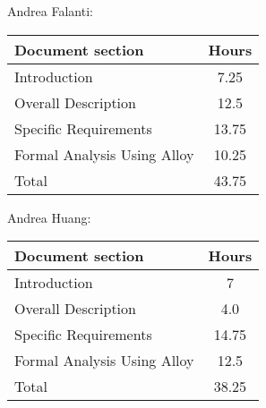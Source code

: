 Andrea Falanti:

\begin{tabular}{|l|c|}
    \hline
    Document section & Hours \\
    \hline
     Introduction & 7.25\\
     Overall Description & 12.5\\
     Specific Requirements & 13.75\\
     Formal Analysis Using Alloy & 10.25\\
     \hline
     Total & 43.75\\
     \hline
\end{tabular}
\vskip 0.3in

Andrea Huang:

\begin{tabular}{|l|c|}
    \hline
    Document section & Hours \\
    \hline
     Introduction &  7\\
     Overall Description & 4.0\\
     Specific Requirements & 14.75\\
     Formal Analysis Using Alloy & 12.5\\
     \hline
     Total & 38.25\\
     \hline
\end{tabular}
